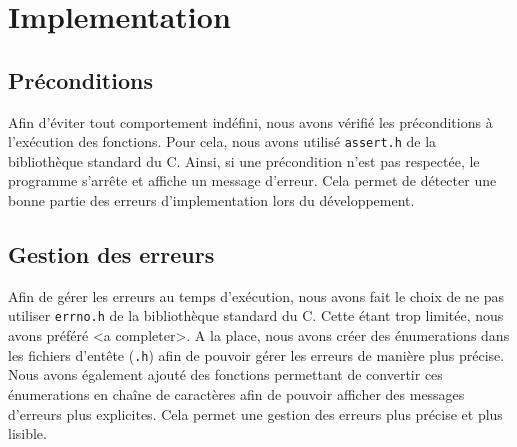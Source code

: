 \section{Implementation}

\subsection{Préconditions}

Afin d'éviter tout comportement indéfini, nous avons vérifié les préconditions à l'exécution des fonctions.
Pour cela, nous avons utilisé \texttt{assert.h} de la bibliothèque standard du C. 
Ainsi, si une précondition n'est pas respectée, le programme s'arrête et affiche un message d'erreur.
Cela permet de détecter une bonne partie des erreurs d'implementation lors du développement.

\subsection{Gestion des erreurs}

Afin de gérer les erreurs au temps d'exécution, nous avons fait le choix de ne pas utiliser \texttt{errno.h} de la bibliothèque standard du C.
Cette étant trop limitée, nous avons préféré <a completer>.
A la place, nous avons créer des énumerations dans les fichiers d'entête (\texttt{.h}) afin de pouvoir gérer les erreurs de manière plus précise.
Nous avons également ajouté des fonctions permettant de convertir ces énumerations en chaîne de caractères afin de pouvoir afficher des messages d'erreurs plus explicites.
Cela permet une gestion des erreurs plus précise et plus lisible.
